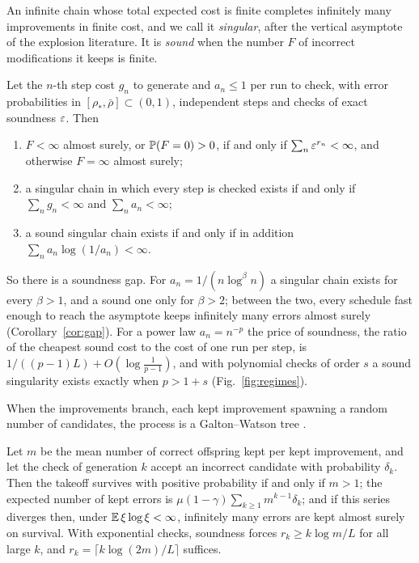 An infinite chain whose total expected cost is finite completes infinitely many improvements in finite cost, and we call it \emph{singular}, after the vertical asymptote of the explosion literature. It is \emph{sound} when the number $F$ of incorrect modifications it keeps is finite.

\begin{mainthm}\label{thm:E}
Let the $n$-th step cost $g_{n}$ to generate and $a_{n}\le1$ per run to check, with error probabilities in $[\rho_{\ast},\bar\rho]\subset(0,1)$, independent steps and checks of exact soundness $\varepsilon$. Then
\begin{enumerate}[label=\textup{(\roman*)},leftmargin=2.2em,itemsep=1pt]
\item $F<\infty$ almost surely, or $\mathbb{P}(F=0)>0$, if and only if $\sum_{n}\varepsilon^{r_{n}}<\infty$, and otherwise $F=\infty$ almost surely;
\item a singular chain in which every step is checked exists if and only if $\sum_{n}g_{n}<\infty$ and $\sum_{n}a_{n}<\infty$;
\item a sound singular chain exists if and only if in addition $\sum_{n}a_{n}\log(1/a_{n})<\infty$.
\end{enumerate}
\end{mainthm}

So there is a soundness gap. For $a_{n}=1/(n\log^{\beta}n)$ a singular chain exists for every $\beta>1$, and a sound one only for $\beta>2$; between the two, every schedule fast enough to reach the asymptote keeps infinitely many errors almost surely (Corollary~\ref{cor:gap}). For a power law $a_{n}=n^{-p}$ the price of soundness, the ratio of the cheapest sound cost to the cost of one run per step, is $1/((p-1)L)+O(\log\frac1{p-1})$, and with polynomial checks of order $s$ a sound singularity exists exactly when $p>1+s$ (Fig.~\ref{fig:regimes}).

When the improvements branch, each kept improvement spawning a random number of candidates, the process is a Galton--Watson tree \cite{WG75,AN72}.

\begin{mainthm}\label{thm:F}
Let $m$ be the mean number of correct offspring kept per kept improvement, and let the check of generation $k$ accept an incorrect candidate with probability $\delta_{k}$. Then the takeoff survives with positive probability if and only if $m>1$; the expected number of kept errors is $\mu(1-\gamma)\sum_{k\ge1}m^{k-1}\delta_{k}$; and if this series diverges then, under $\mathbb{E}\,\xi\log\xi<\infty$, infinitely many errors are kept almost surely on survival. With exponential checks, soundness forces $r_{k}\ge k\log m/L$ for all large $k$, and $r_{k}=\lceil k\log(2m)/L\rceil$ suffices.
\end{mainthm}

